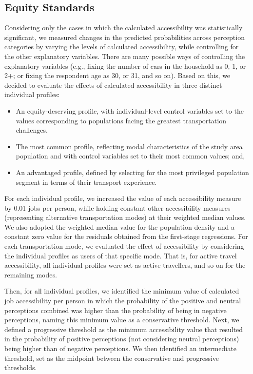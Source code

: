 \documentclass[preprint, 3p,
authoryear]{elsarticle} %
\begin{document}
\subsection{Equity Standards}\label{equity-standards-1}

Considering only the cases in which the calculated accessibility was
statistically significant, we measured changes in the predicted
probabilities across perception categories by varying the levels of
calculated accessibility, while controlling for the other explanatory
variables. There are many possible ways of controlling the explanatory
variables (e.g., fixing the number of cars in the household as 0, 1, or
2+; or fixing the respondent age as 30, or 31, and so on). Based on
this, we decided to evaluate the effects of calculated accessibility in
three distinct individual profiles:

\begin{itemize}
\item
  An equity-deserving profile, with individual-level control variables
  set to the values corresponding to populations facing the greatest
  transportation challenges.
\item
  The most common profile, reflecting modal characteristics of the study
  area population and with control variables set to their most common
  values; and,
\item
  An advantaged profile, defined by selecting for the most privileged
  population segment in terms of their transport experience.
\end{itemize}

For each individual profile, we increased the value of each
accessibility measure by 0.01 jobs per person, while holding constant
other accessibility measures (representing alternative transportation
modes) at their weighted median values. We also adopted the weighted
median value for the population density and a constant zero value for
the residuals obtained from the first-stage regressions. For each
transportation mode, we evaluated the effect of accessibility by
considering the individual profiles as users of that specific mode. That
is, for active travel accessibility, all individual profiles were set as
active travellers, and so on for the remaining modes.

Then, for all individual profiles, we identified the minimum value of
calculated job accessibility per person in which the probability of the
positive and neutral perceptions combined was higher than the
probability of being in negative perceptions, naming this minimum value
as a conservative threshold. Next, we defined a progressive threshold as
the minimum accessibility value that resulted in the probability of
positive perceptions (not considering neutral perceptions) being higher
than of negative perceptions. We then identified an intermediate
threshold, set as the midpoint between the conservative and progressive
thresholds.
\end{document}
